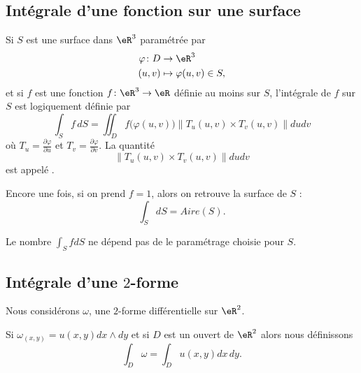 \subsection{Intégrale d'une fonction sur une surface}

Si \( S\) est une surface dans \( \eR^3\) paramétrée par
\begin{equation}
	\begin{aligned}
		\varphi\colon D & \to \eR^3                  \\
		(u,v)           & \mapsto \varphi(u,v)\in S,
	\end{aligned}
\end{equation}
et si \( f\) est une fonction \( f\colon \eR^3\to \eR\) définie au moins sur \( S\), l'intégrale de \( f\) sur \( S\) est logiquement définie par
\begin{equation}
	\int_S f\,dS=\iint_D f\big( \varphi(u,v) \big)\| T_u(u,v)\times T_v(u,v) \|dudv
\end{equation}
où \( T_u=\frac{ \partial \varphi }{ \partial u }\) et \( T_v=\frac{ \partial \varphi }{ \partial v }\). La quantité
\begin{equation}
	\| T_u(u,v)\times T_v(u,v) \|dudv
\end{equation}
est appelé .

Encore une fois, si on prend \( f=1\), alors on retrouve la surface de \( S\) :
\begin{equation}
	\int_SdS=Aire(S).
\end{equation}

\begin{remark}
	Le nombre \( \int_SfdS\) ne dépend pas de le paramétrage choisie pour \( S\).
\end{remark}


\subsection{Intégrale d'une \( 2\)-forme}

Nous considérons \( \omega\), une \( 2\)-forme différentielle sur \( \eR^2\).
\begin{definition}
	Si \( \omega_{(x,y)}=u(x,y)dx\wedge dy\) et si \( D\) est un ouvert de \( \eR^2\) alors nous définissons
	\begin{equation}
		\int_D\omega=\int_D u(x,y)dx\,dy.
	\end{equation}
\end{definition}

